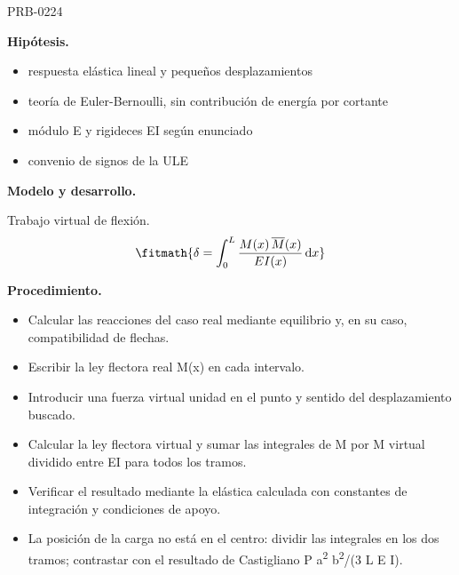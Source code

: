 \begin{studiumworked}{PRB-0224}
\begin{minipage}{\linewidth}
%
\fi
\fi
\endgroup
\par\nopagebreak
{}
\end{minipage}\par\medskip

\textbf{Hipótesis.}\begin{itemize}\item respuesta elástica lineal y pequeños desplazamientos
\item teoría de Euler-Bernoulli, sin contribución de energía por cortante
\item módulo E y rigideces EI según enunciado
\item convenio de signos de la ULE\end{itemize}

\textbf{Modelo y desarrollo.}

Trabajo virtual de flexión.\[\fitmath{\delta = \int_{0}^{L}\frac{M(x)\,\overline{M}(x)}{E I(x)}\,\mathrm{d}x}\]

\textbf{Procedimiento.}\begin{itemize}\item Calcular las reacciones del caso real mediante equilibrio y, en su caso, compatibilidad de flechas.
\item Escribir la ley flectora real M(x) en cada intervalo.
\item Introducir una fuerza virtual unidad en el punto y sentido del desplazamiento buscado.
\item Calcular la ley flectora virtual y sumar las integrales de M por M virtual dividido entre EI para todos los tramos.
\item Verificar el resultado mediante la elástica calculada con constantes de integración y condiciones de apoyo.
\item La posición de la carga no está en el centro: dividir las integrales en los dos tramos; contrastar con el resultado de Castigliano P a\textsuperscript{2} b\textsuperscript{2}/(3 L E I).\end{itemize}


\end{studiumworked}
